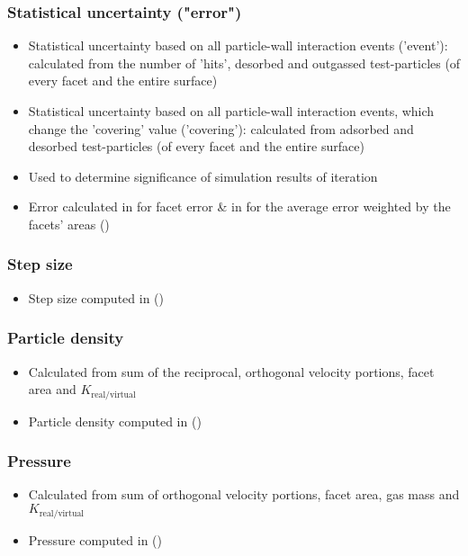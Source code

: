 \subsubsection{Statistical uncertainty ("error")}
\begin{itemize}[noitemsep,topsep=0pt, partopsep=0pt]
\item Statistical uncertainty based on all particle-wall interaction events ('event'): calculated from the number of 'hits', desorbed and outgassed test-particles (of every facet and the entire surface)
\item Statistical uncertainty based on all particle-wall interaction events, which change the 'covering' value ('covering'): calculated from adsorbed and desorbed test-particles (of every facet and the entire surface)
\item Used to determine significance of simulation results of iteration
\item Error calculated in  for facet error \& in  for the average error weighted by the facets' areas ()
\end{itemize}

\subsubsection{Step size}
\begin{itemize}[noitemsep,topsep=0pt, partopsep=0pt]
\item Step size computed in  ()
\end{itemize}

\subsubsection{Particle density}
\begin{itemize}[noitemsep,topsep=0pt, partopsep=0pt]
\item Calculated from sum of the reciprocal, orthogonal velocity portions, facet area and $K_{\text{real}/\text{virtual}}$
\item Particle density computed in  ()
\end{itemize}

\subsubsection{Pressure}
\begin{itemize}[noitemsep,topsep=0pt, partopsep=0pt]
\item Calculated from sum of orthogonal velocity portions, facet area, gas mass and $K_{\text{real}/\text{virtual}}$
\item Pressure computed in  ()
\end{itemize}

